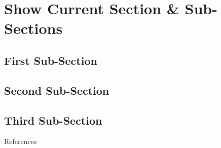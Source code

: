 \documentclass[aspectratio=169,9pt]{beamer}
\begin{document}
\section{Show Current Section \& Sub-Sections}
    \subsection{First Sub-Section}
    \subsection{Second Sub-Section}
    \subsection{Third Sub-Section}

        \begin{frame}[allowframebreaks]{References}
            \printbibliography
        \end{frame}

\appendix

\end{document}
